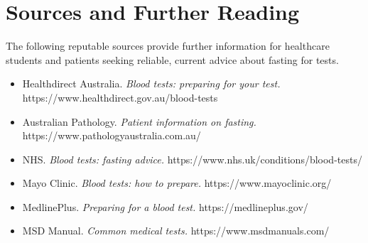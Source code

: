 \section*{Sources and Further Reading}
The following reputable sources provide further information for healthcare students and patients seeking reliable, current advice about fasting for tests.
\begin{itemize}
    \item Healthdirect Australia. \textit{Blood tests: preparing for your test.} https://www.healthdirect.gov.au/blood-tests
    \item Australian Pathology. \textit{Patient information on fasting.} https://www.pathologyaustralia.com.au/
    \item NHS. \textit{Blood tests: fasting advice.} https://www.nhs.uk/conditions/blood-tests/
    \item Mayo Clinic. \textit{Blood tests: how to prepare.} https://www.mayoclinic.org/
    \item MedlinePlus. \textit{Preparing for a blood test.} https://medlineplus.gov/
    \item MSD Manual. \textit{Common medical tests.} https://www.msdmanuals.com/
\end{itemize}
